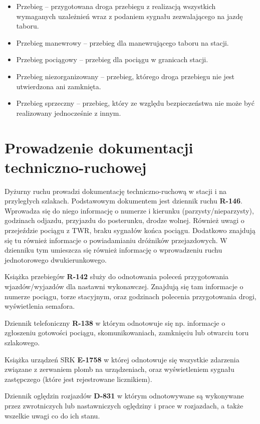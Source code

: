 \begin{itemize}
	\item Przebieg – przygotowana droga przebiegu z realizacją wszystkich wymaganych uzależnień wraz z podaniem sygnału zezwalającego na jazdę taboru.
	\item Przebieg manewrowy – przebieg dla manewrującego taboru na stacji.
	\item Przebieg pociągowy – przebieg dla pociągu w granicach stacji.
	\item Przebieg niezorganizowany – przebieg, którego droga przebiegu nie jest utwierdzona ani zamknięta.
	\item Przebieg sprzeczny – przebieg, który ze względu bezpieczeństwa nie może być realizowany jednocześnie z innym. 
\end{itemize}

\chapter{Prowadzenie dokumentacji techniczno-ruchowej}

Dyżurny ruchu prowadzi dokumentację techniczno-ruchową w stacji i na przyległych szlakach. 
Podstawowym dokumentem jest dziennik ruchu \textbf{R-146}. Wprowadza się do niego informację o numerze i kierunku (parzysty/nieparzysty), godzinach odjazdu, przyjazdu do posterunku, drodze wolnej. Również uwagi o przejeździe pociągu z TWR, braku sygnałów końca pociągu. Dodatkowo znajdują się tu również informacje o powiadamianiu dróżników przejazdowych. W dzienniku tym umieszcza się również informację o wprowadzeniu ruchu jednotorowego dwukierunkowego.

Książka przebiegów \textbf{R-142} służy do odnotowania poleceń przygotowania wjazdów/wyjazdów dla nastawni wykonawczej. Znajdują się tam informacje o numerze pociągu, torze stacyjnym, oraz godzinach polecenia przygotowania drogi, wyświetlenia semafora.

Dziennik telefoniczny \textbf{R-138} w którym odnotowuje się np. informacje o zgłoszeniu gotowości pociągu, skomunikowaniach, zamknięciu lub otwarciu toru szlakowego. 

Książka urządzeń SRK \textbf{E-1758} w której odnotowuje się wszystkie zdarzenia związane z zerwaniem plomb na urządzeniach, oraz wyświetleniem sygnału zastępczego (które jest rejestrowane licznikiem). 

Dziennik oględzin rozjazdów \textbf{D-831} w którym odnotowywane są wykonywane przez zwrotniczych lub nastawniczych oględziny i prace w rozjazdach, a także wszelkie uwagi co do ich stanu.

